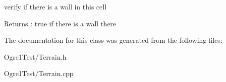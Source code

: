verify if there is a wall in this cell 

\begin{DoxyReturn}{Returns}
\+: true if there is a wall there 
\end{DoxyReturn}


The documentation for this class was generated from the following files\+:\begin{DoxyCompactItemize}
\item 
Ogre1\+Test/Terrain.\+h\item 
Ogre1\+Test/Terrain.\+cpp\end{DoxyCompactItemize}
